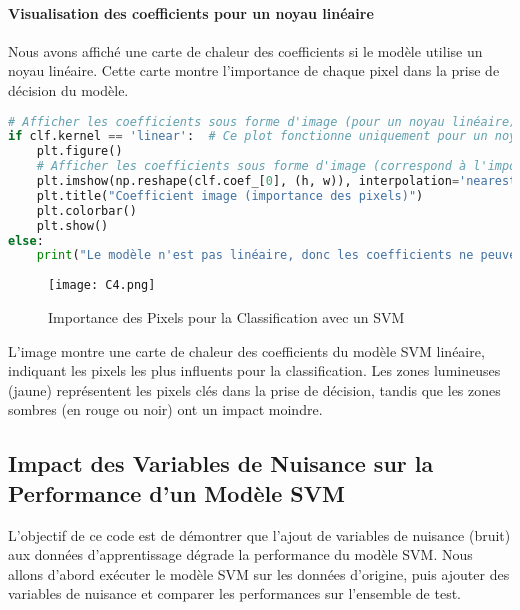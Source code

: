 \documentclass[12pt,a4paper]{report}
\begin{document}
\paragraph{Visualisation des coefficients pour un noyau linéaire\\}
 Nous avons affiché une carte de chaleur des coefficients si le modèle utilise un noyau linéaire. Cette carte montre l'importance de chaque pixel dans la prise de décision du modèle.

\begin{lstlisting}[language=Python, caption=Visualisation des coefficients du modèle linéaire]
# Afficher les coefficients sous forme d'image (pour un noyau linéaire)
if clf.kernel == 'linear':  # Ce plot fonctionne uniquement pour un noyau linéaire
    plt.figure()
    # Afficher les coefficients sous forme d'image (correspond à l'importance des pixels)
    plt.imshow(np.reshape(clf.coef_[0], (h, w)), interpolation='nearest', cmap=plt.cm.hot)
    plt.title("Coefficient image (importance des pixels)")
    plt.colorbar()
    plt.show()
else:
    print("Le modèle n'est pas linéaire, donc les coefficients ne peuvent pas être affichés.")
\end{lstlisting}
\begin{figure}[H]
    \centering
    \begin{minipage}{0.9\textwidth}
        \centering
        \texttt{[image: C4.png]}
        \caption{ Importance des Pixels pour la Classification avec un SVM}
    \end{minipage}
    \end{figure}
L'image montre une carte de chaleur des coefficients du modèle SVM linéaire, indiquant les pixels les plus influents pour la classification. Les zones lumineuses (jaune) représentent les pixels clés dans la prise de décision, tandis que les zones sombres (en rouge ou noir) ont un impact moindre.

\subsection{Impact des Variables de Nuisance sur la Performance d'un Modèle SVM}
L'objectif de ce code est de démontrer que l'ajout de variables de nuisance (bruit) aux données d'apprentissage dégrade la performance du modèle SVM. Nous allons d'abord exécuter le modèle SVM sur les données d'origine, puis ajouter des variables de nuisance et comparer les performances sur l'ensemble de test.
\end{document}
